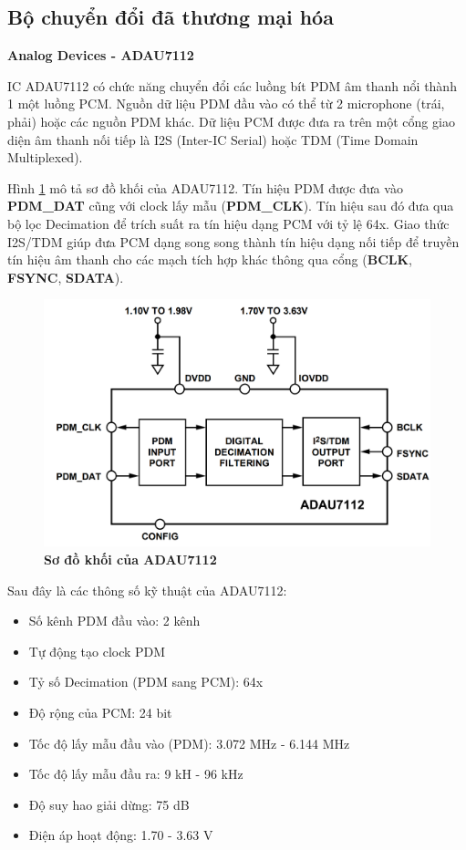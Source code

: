 \subsection{Bộ chuyển đổi đã thương mại hóa}
\noindent\textbf{Analog Devices - ADAU7112} \label{adauref}

IC ADAU7112 có chức năng chuyển đổi các luồng bít PDM âm thanh nổi thành 1 một luồng PCM. Nguồn dữ liệu PDM đầu vào có thể từ 2 microphone (trái, phải) hoặc các nguồn PDM khác. Dữ liệu PCM được đưa ra trên một cổng giao diện âm thanh nối tiếp là I2S (Inter-IC Serial) hoặc TDM (Time Domain Multiplexed). \cite{adau7112}

Hình \ref{adau7112_f} mô tả sơ đồ khối của ADAU7112. Tín hiệu PDM được đưa vào \textbf{PDM\_DAT} cũng với clock lấy mẫu (\textbf{PDM\_CLK}). Tín hiệu sau đó đưa qua bộ lọc Decimation để trích suất ra tín hiệu dạng PCM với tỷ lệ 64x. Giao thức I2S/TDM giúp đưa PCM dạng song song thành tín hiệu dạng nối tiếp để truyền tín hiệu âm thanh cho các mạch tích hợp khác thông qua cổng (\textbf{BCLK}, \textbf{FSYNC}, \textbf{SDATA}).

\begin{figure}[H]
    \centering
    \includegraphics[width=12cm]{Images/Chuong3/MoDau/adau7112.png}
    \caption[Sơ đồ tổng quát của bộ chuyển đổi]{\bfseries \fontsize{12pt}{0pt}\selectfont Sơ đồ khối của ADAU7112}
    \label{adau7112_f}
\end{figure}

Sau đây là các thông số kỹ thuật của ADAU7112:
\begin{itemize}
    \item Số kênh PDM đầu vào: 2 kênh
    \item Tự động tạo clock PDM
    \item Tỷ số Decimation (PDM sang PCM): 64x
    \item Độ rộng của PCM: 24 bit
    \item Tốc độ lấy mẫu đầu vào (PDM): 3.072 MHz - 6.144 MHz
    \item Tốc độ lấy mẫu đầu ra: 9 kH - 96 kHz
    \item Độ suy hao giải dừng: 75 dB
    \item Điện áp hoạt động: 1.70 - 3.63 V
\end{itemize}
